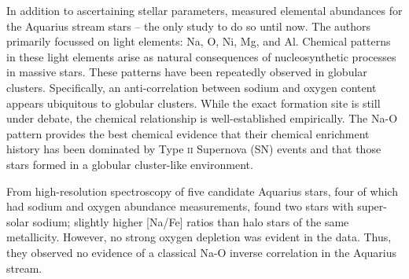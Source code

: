 \documentclass{emulateapj}
\begin{document}
In addition to ascertaining stellar parameters, \citet{wylie-de-boer;et-al_2012} measured elemental abundances for the Aquarius stream stars -- the only study to do so until now. The authors primarily focussed on light elements: Na, O, Ni, Mg, and Al. Chemical patterns in these light elements arise as natural consequences of nucleosynthetic processes in massive stars. These patterns have been repeatedly observed in globular clusters. Specifically, an anti-correlation between sodium and oxygen content appears ubiquitous to globular clusters. While the exact formation site is still under debate, the chemical relationship is well-established empirically. The Na-O pattern provides the best chemical evidence that their chemical enrichment history has been dominated by Type \textsc{ii} Supernova (SN) events and that those stars formed in a globular cluster-like environment.


From high-resolution spectroscopy of five candidate Aquarius stars, four of which had sodium and oxygen abundance measurements, \citet{wylie-de-boer;et-al_2012} found two stars with super-solar sodium; slightly higher [Na/Fe] ratios than halo stars of the same metallicity. However, no strong oxygen depletion was evident in the data. Thus, they observed no evidence of a classical Na-O inverse correlation in the Aquarius stream.
\end{document}
